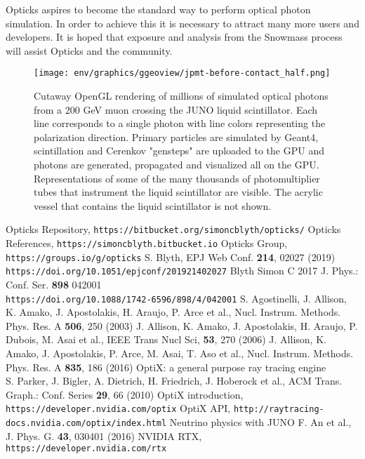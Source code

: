 \documentclass{webofc}
\begin{document}
Opticks aspires to become the standard way to perform optical photon simulation. In order to achieve this
it is necessary to attract many more users and developers. It is hoped that exposure and analysis from 
the Snowmass process will assist Opticks and the community.
%
%
\newpage
%
%
\begin{figure}
\centering
\texttt{[image: env/graphics/ggeoview/jpmt-before-contact\_half.png]}
\caption{Cutaway OpenGL rendering of millions of simulated optical photons from a 200 GeV muon crossing the JUNO liquid scintillator. 
Each line corresponds to a single photon with line colors representing the polarization direction. Primary particles
are simulated by Geant4, scintillation and Cerenkov "gensteps" are uploaded to the GPU and photons are generated, propagated
and visualized all on the GPU. Representations of some of the many thousands of photomultiplier tubes that instrument the liquid scintillator are visible.
The acrylic vessel that contains the liquid scintillator is not shown.
}
\label{problem}
\end{figure}%
%
\begin{thebibliography}{}
%
Opticks Repository, {\tt https://bitbucket.org/simoncblyth/opticks/}
Opticks References, {\tt https://simoncblyth.bitbucket.io}
Opticks Group, {\tt https://groups.io/g/opticks}
S. Blyth, EPJ Web Conf. {\bf 214}, 02027 (2019) \\
{\tt https://doi.org/10.1051/epjconf/201921402027}
Blyth Simon C 2017 J. Phys.: Conf. Ser. {\bf 898} 042001 \\
{\tt https://doi.org/10.1088/1742-6596/898/4/042001}
%
%
%
S. Agostinelli, J. Allison, K. Amako, J. Apostolakis, H. Araujo, P. Arce et al., Nucl. Instrum. Methods. Phys. Res. A {\bf 506}, 250 (2003)
J. Allison, K. Amako, J. Apostolakis, H. Araujo, P. Dubois, M. Asai et al., IEEE Trans Nucl Sci, {\bf 53}, 270 (2006)
J. Allison, K. Amako, J. Apostolakis, P. Arce, M. Asai, T. Aso et al., Nucl. Instrum. Methods. Phys. Res. A {\bf 835}, 186 (2016)
%
%
%
OptiX: a general purpose ray tracing engine \\
S. Parker, J. Bigler, A. Dietrich, H. Friedrich, J. Hoberock et al., ACM Trans. Graph.: Conf. Series {\bf 29}, 66 (2010)
OptiX introduction, {\tt https://developer.nvidia.com/optix}
OptiX API, {\tt http://raytracing-docs.nvidia.com/optix/index.html}
Neutrino physics with JUNO 
F. An et al., J. Phys. G. {\bf 43}, 030401 (2016) 
NVIDIA RTX, {\tt https://developer.nvidia.com/rtx}
%
%

\end{thebibliography}





%
\end{document}
